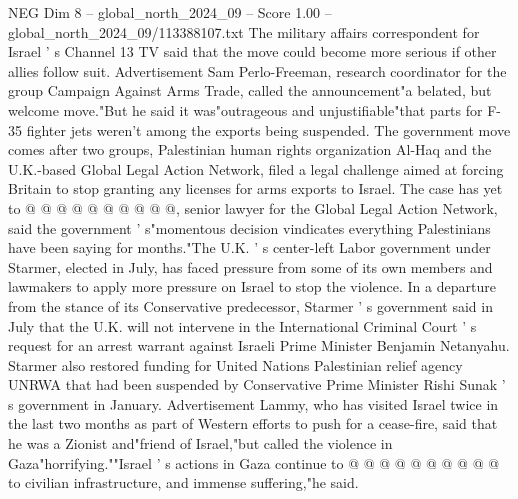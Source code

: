 \begin{textsample}{NEG Dim 8 – global\_north\_2024\_09 – Score 1.00 – global\_north\_2024\_09/113388107.txt}
The military affairs correspondent for Israel ' s Channel 13 TV said that the move could become more serious if other allies follow suit.
Advertisement Sam Perlo-Freeman, research coordinator for the group Campaign Against Arms Trade, called the announcement"a belated, but welcome move."But he said it was"outrageous and unjustifiable"that parts for F-35 fighter jets weren't among the exports being suspended.
The government move comes after two groups, Palestinian human rights organization Al-Haq and the U.K.-based Global Legal Action Network, filed a legal challenge aimed at forcing Britain to stop granting any licenses for arms exports to Israel.
The case has yet to @ @ @ @ @ @ @ @ @ @, senior lawyer for the Global Legal Action Network, said the government ' s"momentous decision vindicates everything Palestinians have been saying for months."The U.K. ' s center-left Labor government under Starmer, elected in July, has faced pressure from some of its own members and lawmakers to apply more pressure on Israel to stop the violence.
In a departure from the stance of its Conservative predecessor, Starmer ' s government said in July that the U.K. will not intervene in the International Criminal Court ' s request for an arrest warrant against Israeli Prime Minister Benjamin Netanyahu.
Starmer also restored funding for United Nations Palestinian relief agency UNRWA that had been suspended by Conservative Prime Minister Rishi Sunak ' s government in January.
Advertisement Lammy, who has visited Israel twice in the last two months as part of Western efforts to push for a cease-fire, said that he was a Zionist and"friend of Israel,"but called the violence in Gaza"horrifying.""Israel ' s actions in Gaza continue to @ @ @ @ @ @ @ @ @ @ to civilian infrastructure, and immense suffering,"he said.

\end{textsample}
